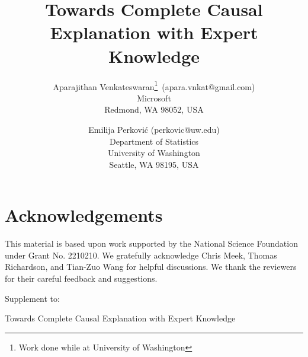 \documentclass[11pt]{article}
\title{Towards Complete Causal Explanation with Expert Knowledge}
\author{Aparajithan Venkateswaran\thanks{Work done while at University of Washington}\ (apara.vnkat@gmail.com) \\ Microsoft\\
              Redmond, WA 98052, USA \and 
       Emilija Perkovi\'c  (perkovic@uw.edu) \\
        Department of Statistics\\
              University of Washington\\
              Seattle, WA 98195, USA}
\date{}
\theoremstyle{plain}%
\begin{document}
\maketitle


\begin{abstract}

\end{abstract}




\section*{Acknowledgements}
This material is based upon work supported by the National Science Foundation under Grant No. 2210210. We gratefully acknowledge Chris Meek, Thomas Richardson, and Tian-Zuo Wang for helpful discussions. We thank the reviewers for their careful feedback and suggestions.






%
%

\newpage
\appendix



\centerline{\LARGE{Supplement to:}}
\centerline{\LARGE{Towards Complete Causal Explanation with Expert Knowledge}}

\tableofcontents



\nocite{*}

\end{document}
